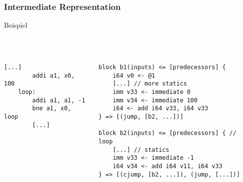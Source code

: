 \begin{frame}[fragile]
    \frametitle{Intermediate Representation}{Beispiel}
    \pause{}
    ~\\
    ~\\
    ~\\
    \begin{columns}[c]
        \begin{lstlisting}[language=rv64]
        [...]
        addi a1, x0, 100
    loop:
        addi a1, a1, -1
        bne a1, x0, loop
        [...]
        \end{lstlisting}

        \pause{}

        \pause{}

        \begin{lstlisting}[language=SbtIr]
block b1(inputs) <= [predecessors] {
    i64 v0 <- @1
    [...] // more statics
    imm v33 <- immediate 0
    imm v34 <- immediate 100
    i64 <- add i64 v33, i64 v33
} => [(jump, [b2, ...])]

block b2(inputs) <= [predecessors] { // loop
    [...] // statics
    imm v33 <- immediate -1
    i64 v34 <- add i64 v11, i64 v33
} => [(cjump, [b2, ...]), (jump, [...])]
    \end{lstlisting}
    \end{columns}

\end{frame}
\clearpage


